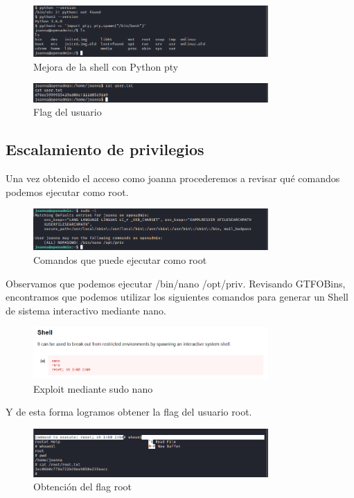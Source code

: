 \documentclass{article}
\begin{document}
\begin{figure}[H]
	\center
	\includegraphics[width=0.8\textwidth]{images/openadmin/17-alternativa2.png}
	\caption{Mejora de la shell con Python pty}
\end{figure}

\begin{figure}[H]
	\center
	\includegraphics[width=0.8\textwidth]{images/openadmin/17-alternativa3.png}
	\caption{Flag del usuario}
\end{figure}

\subsection{Escalamiento de privilegios}

Una vez obtenido el acceso como joanna procederemos a revisar qué comandos podemos ejecutar como root.
\begin{figure}[H]
	\center
	\includegraphics[width=0.8\textwidth]{images/openadmin/18-sudol.png}
	\caption{Comandos que puede ejecutar como root}
\end{figure}

Observamos que podemos ejecutar /bin/nano /opt/priv. Revisando GTFOBins, encontramos que podemos utilizar los siguientes comandos para generar un Shell de sistema interactivo mediante nano.
\begin{figure}[H]
	\center
	\includegraphics[width=0.8\textwidth]{images/openadmin/19-gtfobins.png}
	\caption{Exploit mediante sudo nano}
\end{figure}

Y de esta forma logramos obtener la flag del usuario root.
\begin{figure}[H]
	\center
	\includegraphics[width=0.8\textwidth]{images/openadmin/20-privilegio.png}
	\caption{Obtención del flag root}
\end{figure}
\end{document}
